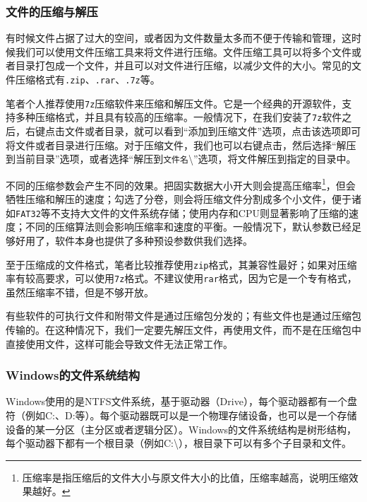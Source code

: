 \subsubsection{文件的压缩与解压}

有时候文件占据了过大的空间，或者因为文件数量太多而不便于传输和管理，这时候我们可以使用文件压缩工具来将文件进行压缩。文件压缩工具可以将多个文件或者目录打包成一个文件，并且可以对文件进行压缩，以减少文件的大小。常见的文件压缩格式有\texttt{.zip}、\texttt{.rar}、\texttt{.7z}等。

笔者个人推荐使用\texttt{7z}压缩软件来压缩和解压文件。它是一个经典的开源软件，支持多种压缩格式，并且具有较高的压缩率。一般情况下，在我们安装了\texttt{7z}软件之后，右键点击文件或者目录，就可以看到“添加到压缩文件”选项，点击该选项即可将文件或者目录进行压缩。对于压缩文件，我们也可以右键点击，然后选择“解压到当前目录”选项，或者选择“解压到\texttt{文件名}\textbackslash”选项，将文件解压到指定的目录中。

不同的压缩参数会产生不同的效果。把固实数据大小开大则会提高压缩率\footnote{压缩率是指压缩后的文件大小与原文件大小的比值，压缩率越高，说明压缩效果越好。}，但会牺牲压缩和解压的速度；勾选了分卷，则会将压缩文件分割成多个小文件，便于诸如\texttt{FAT32}等不支持大文件的文件系统存储；使用内存和CPU则显著影响了压缩的速度；不同的压缩算法则会影响压缩率和速度的平衡。一般情况下，默认参数已经足够好用了，软件本身也提供了多种预设参数供我们选择。

至于压缩成的文件格式，笔者比较推荐使用\texttt{zip}格式，其兼容性最好；如果对压缩率有较高要求，可以使用\texttt{7z}格式。不建议使用\texttt{rar}格式，因为它是一个专有格式，虽然压缩率不错，但是不够开放。

\begin{caution}
  有些软件的可执行文件和附带文件是通过压缩包分发的；有些文件也是通过压缩包传输的。在这种情况下，我们一定要先解压文件，再使用文件，而不是在压缩包中直接使用文件，这样可能会导致文件无法正常工作。
\end{caution}

\subsubsection{Windows的文件系统结构}

Windows使用的是NTFS文件系统，基于驱动器（Drive），每个驱动器都有一个盘符（例如C:、D:等）。每个驱动器既可以是一个物理存储设备，也可以是一个存储设备的某一分区（主分区或者逻辑分区）。Windows的文件系统结构是树形结构，每个驱动器下都有一个根目录（例如C:\textbackslash），根目录下可以有多个子目录和文件。

